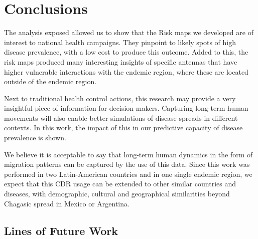 %
%



\section{Conclusions}\label{section:conclusions}


The analysis exposed allowed us to show that the Risk maps we developed are of interest to national health campaigns.
They pinpoint to likely spots of high disease prevalence, with a low cost to produce this outcome.
Added to this, the risk maps produced many interesting insights of specific antennas that have higher vulnerable interactions with the endemic region, where these are located outside of the endemic region.

Next to traditional health control actions, this research may provide a very insightful piece of information for decision-makers.
Capturing long-term human movements will also enable better simulations of disease spreads in different contexts.
In this work, the impact of this in our predictive capacity of disease prevalence is shown.

We believe it is acceptable to say that long-term human dynamics in the form of migration patterns can be captured by the use of this data.
Since this work was performed in two Latin-American countries and in one single endemic region, we expect that this CDR usage can be extended to other similar countries and diseases, with demographic, cultural and geographical similarities beyond Chagasic spread in Mexico or Argentina.



\subsection{ Lines of Future Work }

